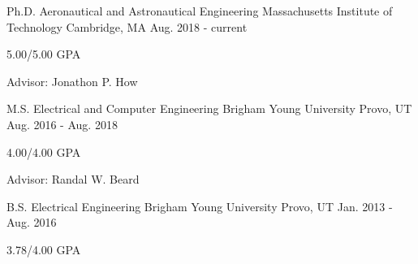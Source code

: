

\begin{cventries}

\cventry
	{Ph.D. Aeronautical and Astronautical Engineering} %
	{Massachusetts Institute of Technology} %
	{Cambridge, MA} %
	{Aug. 2018 - current} %
	{
		\begin{cvitems} %
			\item 5.00/5.00 GPA
			\item Advisor: Jonathon P. How
		\end{cvitems}
	}

\cventry
	{M.S. Electrical and Computer Engineering} %
	{Brigham Young University} %
	{Provo, UT} %
	{Aug. 2016 - Aug. 2018} %
	{
		\begin{cvitems} %
			\item 4.00/4.00 GPA
			\item Advisor: Randal W. Beard
		\end{cvitems}
	}
	
  \cventry
    {B.S. Electrical Engineering} %
    {Brigham Young University} %
    {Provo, UT} %
    {Jan. 2013 - Aug. 2016} %
    {
      \begin{cvitems} %
        \item 3.78/4.00 GPA
      \end{cvitems}
    }

\end{cventries}
